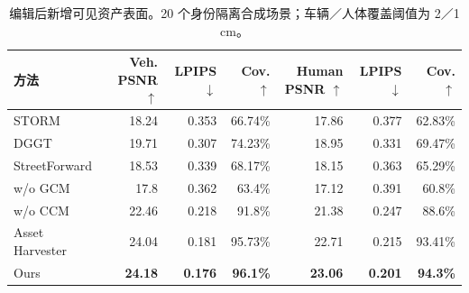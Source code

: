 \begin{table}[H]
\centering\small
\setlength{\tabcolsep}{4pt}
\caption{编辑后新增可见资产表面。20 个身份隔离合成场景；车辆／人体覆盖阈值为 2／1 cm。}
\label{tab:asset-reuse}
\begin{tabular}{@{}lrrrrrr@{}}
\toprule
方法 & Veh. PSNR $\uparrow$ & LPIPS $\downarrow$ & Cov. $\uparrow$ & Human PSNR $\uparrow$ & LPIPS $\downarrow$ & Cov. $\uparrow$ \\
\midrule
STORM & 18.24 & 0.353 & 66.74\% & 17.86 & 0.377 & 62.83\% \\
DGGT & 19.71 & 0.307 & 74.23\% & 18.95 & 0.331 & 69.47\% \\
StreetForward & 18.53 & 0.339 & 68.17\% & 18.15 & 0.363 & 65.29\% \\
w/o GCM & 17.8 & 0.362 & 63.4\% & 17.12 & 0.391 & 60.8\% \\
w/o CCM & 22.46 & 0.218 & 91.8\% & 21.38 & 0.247 & 88.6\% \\
Asset Harvester & 24.04 & 0.181 & 95.73\% & 22.71 & 0.215 & 93.41\% \\
Ours & \textbf{24.18} & \textbf{0.176} & \textbf{96.1\%} & \textbf{23.06} & \textbf{0.201} & \textbf{94.3\%} \\
\bottomrule
\end{tabular}
\end{table}
